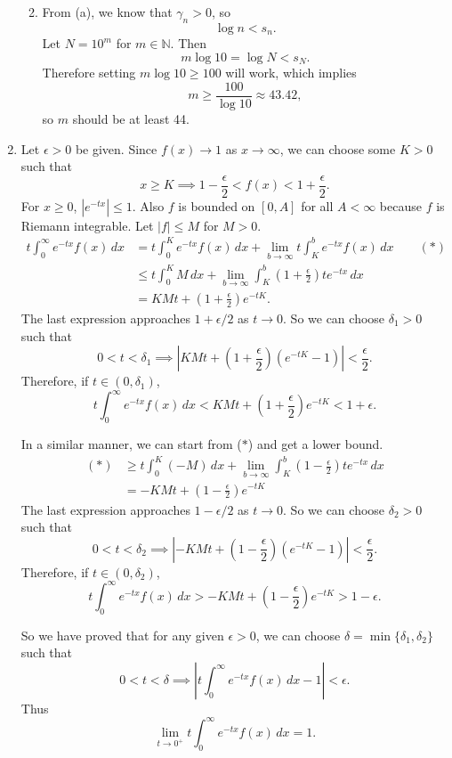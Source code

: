 \documentclass[12pt]{report}
\newcommand{\numl}[1]{\item[\large\textbf{\sffamily #1.}]}
\newcommand{\num}[1]{\item[\textbf{\sffamily #1}]}
\newcommand{\abs}[1]{\left| #1 \right|}
\newcommand{\ra}{\rightarrow}
\newcommand{\mast}{\(\ast\)}
\newcommand{\N}{\mathbb{N}}
\renewcommand{\d}[1]{\,d{#1}}
\begin{document}
\begin{enumerate}
\begin{enumerate}
        \num{(b)} From {\sffamily (a)}, we know that \(\gamma_n > 0\), so
        \[
            \log n < s_n.
        \]
        Let \(N = 10^m\) for \(m \in \N\). Then
        \[
            m \log 10 = \log N < s_N.
        \]
        Therefore setting \(m \log 10 \geq 100\) will work, which implies
        \[
            m \geq \frac{100}{\log 10} \approx 43.42,
        \]
        so \(m\) should be at least 44.
    \end{enumerate}

    \pagebreak

    \numl{8} Let \(\epsilon > 0\) be given. Since \(f(x) \ra 1\) as \(x \ra \infty\), we can choose some \(K > 0\) such that
    \[
        x \geq K \implies 1 - \frac{\epsilon}{2} < f(x) < 1 + \frac{\epsilon}{2}.
    \]
    For \(x \geq 0\), \(\abs{e^{-tx}} \leq 1\). Also \(f\) is bounded on \([0, A]\) for all \(A < \infty\) because \(f\) is Riemann integrable. Let \(\abs{f} \leq M\) for \(M > 0\).
    \[
        \begin{aligned}
            t\int_0^\infty e^{-tx}f(x)\d{x} & = t\int_0^K e^{-tx}f(x)\d{x} + \lim_{b \ra \infty} t\int_K^b e^{-tx} f(x) \d{x} \qquad (\ast)          \\
                                            & \leq t \int_0^K M\d{x} + \lim_{b \ra\infty} \int_K^b \left(1 + \frac{\epsilon}{2}\right)te^{-tx} \d{x} \\
                                            & = KMt + \left(1 + \frac{\epsilon}{2}\right)e^{-tK}.
        \end{aligned}
    \]
    The last expression approaches \(1 + \epsilon/2\) as \(t \ra 0\). So we can choose \(\delta_1 > 0\) such that
    \[
        0 < t < \delta_1 \implies \abs{KMt + \left(1 + \frac{\epsilon}{2}\right)(e^{-tK} - 1)} < \frac{\epsilon}{2}.
    \]
    Therefore, if \(t \in (0, \delta_1)\),
    \[
        t\int_0^\infty e^{-tx}f(x)\d{x} < KMt + \left(1 + \frac{\epsilon}{2}\right)e^{-tK} < 1 + \epsilon.
    \]

    In a similar manner, we can start from (\mast) and get a lower bound.
    \[
        \begin{aligned}
            (\ast) & \geq t \int_0^K (-M) \d{x} + \lim_{b \ra \infty} \int_K^b \left(1 - \frac{\epsilon}{2}\right) te^{-tx} \d{x} \\
                   & = -KMt + \left(1 - \frac{\epsilon}{2}\right)e^{-tK}
        \end{aligned}
    \]
    The last expression approaches \(1 - \epsilon/2\) as \(t \ra 0\). So we can choose \(\delta_2 > 0\) such that
    \[
        0 < t < \delta_2 \implies \abs{-KMt + \left(1 - \frac{\epsilon}{2}\right)(e^{-tK} - 1)} < \frac{\epsilon}{2}.
    \]
    Therefore, if \(t \in (0, \delta_2)\),
    \[
        t\int_0^\infty e^{-tx}f(x)\d{x} > -KMt + \left(1 - \frac{\epsilon}{2}\right)e^{-tK} > 1 - \epsilon.
    \]

    So we have proved that for any given \(\epsilon > 0\), we can choose \(\delta = \min\{\delta_1, \delta_2\}\) such that
    \[
        0 < t < \delta \implies \abs{t\int_0^\infty e^{-tx}f(x)\d{x} - 1} < \epsilon.
    \]
    Thus
    \[
        \lim_{t \ra 0^+} t\int_0^\infty e^{-tx} f(x) \d{x} = 1.
    \]
\end{enumerate}
\end{document}
